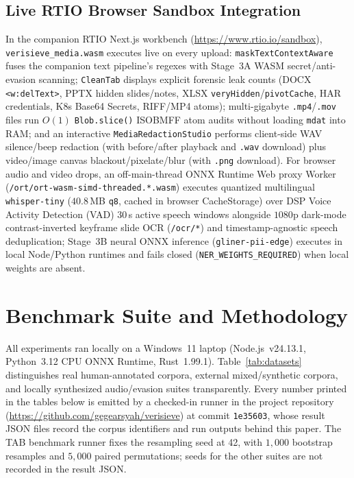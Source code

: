 \documentclass{article}
\begin{document}
\subsection{Live RTIO Browser Sandbox Integration}
In the companion RTIO Next.js workbench (\url{https://www.rtio.io/sandbox}), \texttt{verisieve\_media.wasm} executes live on every upload: \texttt{maskTextContextAware} fuses the companion text pipeline's regexes \citep{ardiyansyah2026verisieve} with Stage~3A WASM secret/anti-evasion scanning; \texttt{CleanTab} displays explicit forensic leak counts (DOCX \texttt{<w:delText>}, PPTX hidden slides/notes, XLSX \texttt{veryHidden}/\texttt{pivotCache}, HAR credentials, K8s Base64 Secrets, RIFF/MP4 atoms); multi-gigabyte \texttt{.mp4}/\texttt{.mov} files run $O(1)$ \texttt{Blob.slice()} ISOBMFF atom audits without loading \texttt{mdat} into RAM; and an interactive \texttt{MediaRedactionStudio} performs client-side WAV silence/beep redaction (with before/after playback and \texttt{.wav} download) plus video/image canvas blackout/pixelate/blur (with \texttt{.png} download). For browser audio and video drops, an off-main-thread ONNX Runtime Web proxy Worker (\texttt{/ort/ort-wasm-simd-threaded.*.wasm}) executes quantized multilingual \texttt{whisper-tiny} ($40.8$\,MB \texttt{q8}, cached in browser CacheStorage) over DSP Voice Activity Detection (VAD) $30$\,s active speech windows alongside $1080$p dark-mode contrast-inverted keyframe slide OCR (\texttt{/ocr/*}) and timestamp-agnostic speech deduplication; Stage~3B neural ONNX inference (\texttt{gliner-pii-edge}) executes in local Node/Python runtimes and fails closed (\texttt{NER\_WEIGHTS\_REQUIRED}) when local weights are absent.

\section{Benchmark Suite and Methodology}
\label{sec:datasets}

All experiments ran locally on a Windows~11 laptop (Node.js~v24.13.1, Python~3.12 CPU ONNX Runtime, Rust~1.99.1). Table~\ref{tab:datasets} distinguishes real human-annotated corpora, external mixed/synthetic corpora, and locally synthesized audio/evasion suites transparently. Every number printed in the tables below is emitted by a checked-in runner in the project repository (\url{https://github.com/gegearsyah/verisieve}) at commit \texttt{1e35603}, whose result JSON files record the corpus identifiers and run outputs behind this paper. The TAB benchmark runner fixes the resampling seed at 42, with $1{,}000$ bootstrap resamples and $5{,}000$ paired permutations; seeds for the other suites are not recorded in the result JSON.
\end{document}
